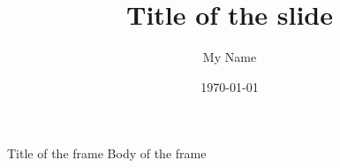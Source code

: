 \documentclass[
  xetex, %
  unicode,
  10pt 
]{beamer}
\title{Title of the slide}
\author{My Name}
\institute{My University}
\date{\today}
\begin{document}
\maketitle

\begin{frame}{Title of the frame}
  Body of the frame
\end{frame}
\end{document}
